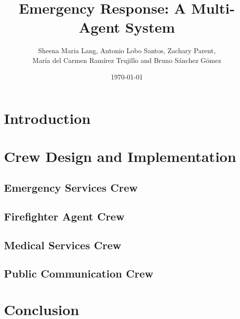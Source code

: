 \documentclass[a4paper]{article}
\title{Emergency Response: A Multi-Agent System}
\author{Sheena Maria Lang, Antonio Lobo Santos, Zachary Parent, \\ María del Carmen Ramírez Trujillo and Bruno Sánchez Gómez}
\date{\today}
\begin{document}
\maketitle
\tableofcontents
\newpage

\section{Introduction}


\section{Crew Design and Implementation}

\subsection{Emergency Services Crew}



\subsection{Firefighter Agent Crew}



\subsection{Medical Services Crew}



\subsection{Public Communication Crew}







\section{Conclusion}
\end{document}
